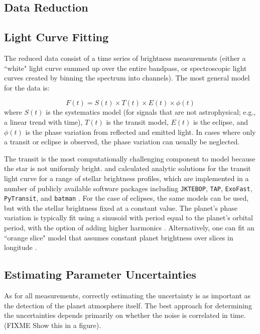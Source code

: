 \documentclass[graybox,natbib,nosecnum]{svmult}
\begin{document}
\subsection{Data Reduction}

\subsection{Light Curve Fitting}
The reduced data consist of a time series of brightness measurements (either a ``white" light curve summed up over the entire bandpass, or spectroscopic light curves created by binning the spectrum into channels).  The most general model for the data is:

\begin{equation}
F(t) = S(t) \times T(t) \times E(t) \times \phi(t)
\end{equation}
where $S(t)$ is the systematics model (for signals that are not astrophysical; e.g., a linear trend with time), $T(t)$ is the transit model, $E(t)$ is the eclipse, and $\phi(t)$ is the phase variation from reflected and emitted light. In cases where only a transit or eclipse is observed, the phase variation can usually be neglected.

The transit is the most computationally challenging component to model because the star is not uniformly bright. \cite{mandel02} and \cite{gimenez06} calculated analytic solutions for the transit light curve for a range of stellar brightness profiles,  which are implemented in a number of publicly available software packages including \texttt{JKTEBOP}, \texttt{TAP}, \texttt{ExoFast}, \texttt{PyTransit}, and \texttt{batman} \citep{southworth04, gazak12, eastman13, parviainen15, kreidberg15a}. For the case of eclipses, the same models can be used, but with the stellar brightness fixed at a constant value.  The planet's phase variation is typically fit using a sinusoid with period equal to the planet's orbital period, with the option of adding higher harmonics \citep[e.g.][]{knutson12, stevenson16}. Alternatively, one can fit an ``orange slice" model that assumes constant planet brightness over slices in longitude \citep{knutson07, cowan08}. 

\subsection{Estimating Parameter Uncertainties}
As for all measurements, correctly estimating the uncertainty is as important as the detection of the planet atmosphere itself.  The best approach for determining the uncertainties depends primarily on whether the noise is correlated in time.  (FIXME Show this in a figure). 
\end{document}
